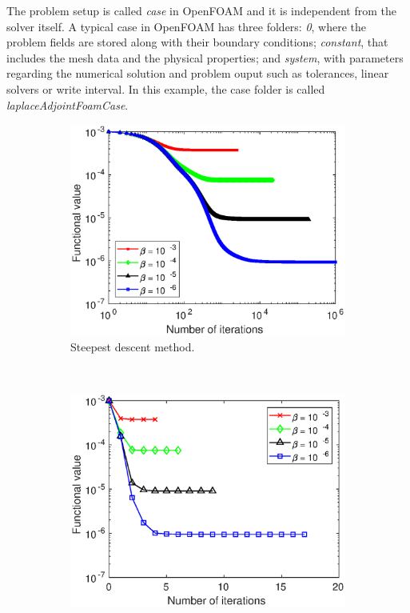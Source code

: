 \documentclass[10pt,a4paper]{article}
\begin{document}
The problem setup is called \textit{case} in OpenFOAM and it is independent from the solver itself. A typical case in OpenFOAM has three folders: \textit{0}, where the problem fields are stored along with their boundary conditions; \textit{constant}, that includes the mesh data and the physical properties; and \textit{system}, with parameters regarding the numerical solution and problem ouput such as tolerances, linear solvers or write interval. In this example, the case folder is called \textit{laplaceAdjointFoamCase}.

\begin{figure}[h]
    \centering
    \begin{subfigure}[b]{0.4\textwidth}
        \includegraphics[width=\textwidth]{sd_J.eps}
        \caption{Steepest descent method.}
        \label{fig:SDcostviterations}
    \end{subfigure}
    ~ %
    \begin{subfigure}[b]{0.4\textwidth}
        \includegraphics[width=\textwidth]{cg_J.eps}

\end{subfigure}
\end{figure}
\end{document}
